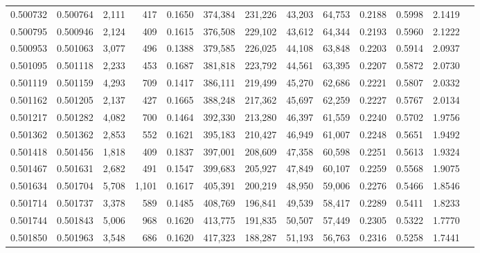 \begin{tabular}{rrrrrrrrrrrrr}
0.500732 & 0.500764 & 2,111 &   417 &                                     0.1650 & 374,384 & 231,226 &  43,203 &  64,753 & 0.2188 & 0.5998 & 2.1419 \\
0.500795 & 0.500946 & 2,124 &   409 &                                     0.1615 & 376,508 & 229,102 &  43,612 &  64,344 & 0.2193 & 0.5960 & 2.1222 \\
0.500953 & 0.501063 & 3,077 &   496 &                                     0.1388 & 379,585 & 226,025 &  44,108 &  63,848 & 0.2203 & 0.5914 & 2.0937 \\
0.501095 & 0.501118 & 2,233 &   453 &                                     0.1687 & 381,818 & 223,792 &  44,561 &  63,395 & 0.2207 & 0.5872 & 2.0730 \\
0.501119 & 0.501159 & 4,293 &   709 &                                     0.1417 & 386,111 & 219,499 &  45,270 &  62,686 & 0.2221 & 0.5807 & 2.0332 \\
0.501162 & 0.501205 & 2,137 &   427 &                                     0.1665 & 388,248 & 217,362 &  45,697 &  62,259 & 0.2227 & 0.5767 & 2.0134 \\
0.501217 & 0.501282 & 4,082 &   700 &                                     0.1464 & 392,330 & 213,280 &  46,397 &  61,559 & 0.2240 & 0.5702 & 1.9756 \\
0.501362 & 0.501362 & 2,853 &   552 &                                     0.1621 & 395,183 & 210,427 &  46,949 &  61,007 & 0.2248 & 0.5651 & 1.9492 \\
0.501418 & 0.501456 & 1,818 &   409 &                                     0.1837 & 397,001 & 208,609 &  47,358 &  60,598 & 0.2251 & 0.5613 & 1.9324 \\
0.501467 & 0.501631 & 2,682 &   491 &                                     0.1547 & 399,683 & 205,927 &  47,849 &  60,107 & 0.2259 & 0.5568 & 1.9075 \\
0.501634 & 0.501704 & 5,708 & 1,101 &                                     0.1617 & 405,391 & 200,219 &  48,950 &  59,006 & 0.2276 & 0.5466 & 1.8546 \\
0.501714 & 0.501737 & 3,378 &   589 &                                     0.1485 & 408,769 & 196,841 &  49,539 &  58,417 & 0.2289 & 0.5411 & 1.8233 \\
0.501744 & 0.501843 & 5,006 &   968 &                                     0.1620 & 413,775 & 191,835 &  50,507 &  57,449 & 0.2305 & 0.5322 & 1.7770 \\
0.501850 & 0.501963 & 3,548 &   686 &                                     0.1620 & 417,323 & 188,287 &  51,193 &  56,763 & 0.2316 & 0.5258 & 1.7441 \\

\end{tabular}
